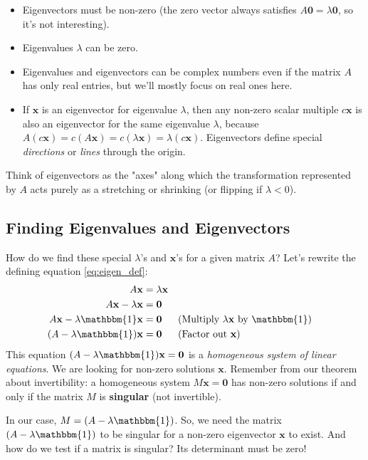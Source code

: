 \documentclass[11pt]{article}
\newcommand{\x}{\mathbf{x}}
\newcommand{\id}{\mathbbm{1}}
\begin{document}
\begin{remark}
\begin{itemize}
    \item Eigenvectors must be non-zero (the zero vector always satisfies $A\mathbf{0} = \lambda \mathbf{0}$, so it's not interesting).
    \item Eigenvalues $\lambda$ can be zero.
    \item Eigenvalues and eigenvectors can be complex numbers even if the matrix $A$ has only real entries, but we'll mostly focus on real ones here.
    \item If $\x$ is an eigenvector for eigenvalue $\lambda$, then any non-zero scalar multiple $c\x$ is also an eigenvector for the same eigenvalue $\lambda$, because $A(c\x) = c(A\x) = c(\lambda\x) = \lambda(c\x)$. Eigenvectors define special \textit{directions} or \textit{lines} through the origin.
\end{itemize}
\end{remark}

Think of eigenvectors as the "axes" along which the transformation represented by $A$ acts purely as a stretching or shrinking (or flipping if $\lambda < 0$).

\subsection{Finding Eigenvalues and Eigenvectors}

How do we find these special $\lambda$'s and $\x$'s for a given matrix $A$?
Let's rewrite the defining equation \eqref{eq:eigen_def}:
\begin{align*}
    A\x &= \lambda \x \\
    A\x - \lambda \x &= \mathbf{0} \\
    A\x - \lambda \id \x &= \mathbf{0} && \text{(Multiply } \lambda \x \text{ by } \id \text{)} \\
    (A - \lambda \id) \x &= \mathbf{0} && \text{(Factor out } \x \text{)}
\end{align*}
This equation $(A - \lambda \id) \x = \mathbf{0}$ is a \textit{homogeneous system of linear equations}. We are looking for non-zero solutions $\x$.
Remember from our theorem about invertibility: a homogeneous system $M\x = \mathbf{0}$ has non-zero solutions if and only if the matrix $M$ is \textbf{singular} (not invertible).

In our case, $M = (A - \lambda \id)$. So, we need the matrix $(A - \lambda \id)$ to be singular for a non-zero eigenvector $\x$ to exist.
And how do we test if a matrix is singular? Its determinant must be zero!
\end{document}
